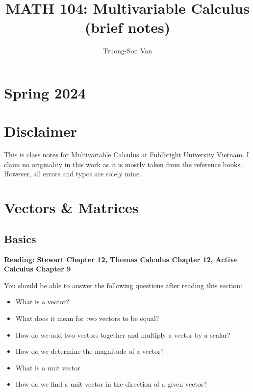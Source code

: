 \documentclass[
]{book}
\title{MATH 104: Multivariable Calculus (brief notes)}
\author{Truong-Son Van}
\date{}
\theoremstyle{definition}
\theoremstyle{definition}
\theoremstyle{definition}
\theoremstyle{definition}
\theoremstyle{remark}
\begin{document}
\maketitle

{
\setcounter{tocdepth}{2}
\tableofcontents
}
\chapter*{Spring 2024}\label{spring-2024}

\chapter*{Disclaimer}\label{disclaimer}


This is class notes for Multivariable Calculus at Fublbright University Vietnam.
I claim no originality in this work as it is mostly taken from the reference books.
However, all errors and typos are solely mine.

\newpage

\newcommand{\vectorproj}[2][]{\mathrm{proj}_{\vect{#1}}\vect{#2}}
\newcommand{\vectorcomp}[2][]{\mathrm{comp}_{\vect{#1}}\vect{#2}}
\newcommand{\vect}{\mathbf}
\newcommand{\R}{\mathbb{R}}

\chapter{Vectors \& Matrices}\label{vectors-matrices}

\section{Basics}\label{basics}

\textbf{Reading: Stewart Chapter 12, Thomas Calculus Chapter 12,
Active Calculus Chapter 9}

You should be able to answer the following questions after reading this section:

\begin{itemize}
\item
  What is a vector?
\item
  What does it mean for two vectors to be equal?
\item
  How do we add two vectors together and multiply a vector by a scalar?
\item
  How do we determine the magnitude of a vector?
\item
  What is a unit vector
\item
  How do we find a unit vector in the direction of a given vector?
\end{itemize}
\end{document}
